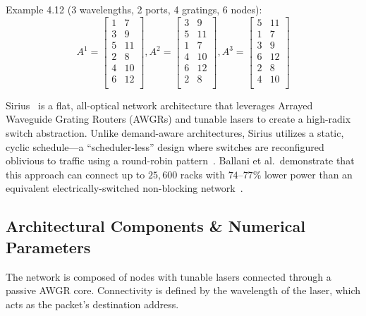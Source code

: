 \documentclass{article}
\begin{document}
    Example 4.12 (3 wavelengths, 2 ports, 4 gratings, 6 nodes): \\
    \[
        A^{1} =
        \begin{bmatrix}
            1 & 7  \\
            3 & 9  \\
            5 & 11 \\
            2 & 8  \\
            4 & 10 \\
            6 & 12 \\
        \end{bmatrix}
        , A^{2} =
        \begin{bmatrix}
            3 & 9  \\
            5 & 11 \\
            1 & 7  \\
            4 & 10 \\
            6 & 12 \\
            2 & 8  \\
        \end{bmatrix}
        , A^{3} =
        \begin{bmatrix}
            5 & 11 \\
            1 & 7  \\
            3 & 9  \\
            6 & 12 \\
            2 & 8  \\
            4 & 10 \\
        \end{bmatrix}
    \]

    Sirius~\cite{sirius} is a flat, all-optical network architecture that leverages Arrayed Waveguide Grating Routers (AWGRs) and tunable lasers to create a high-radix switch abstraction. Unlike demand-aware architectures, Sirius utilizes a static, cyclic schedule---a ``scheduler-less'' design where switches are reconfigured oblivious to traffic using a round-robin pattern~\cite{sirius}. Ballani et al.\ demonstrate that this approach can connect up to $25{,}600$ racks with $74$--$77\%$ lower power than an equivalent electrically-switched non-blocking network~\cite{sirius}.

    \subsection{Architectural Components \& Numerical Parameters}
    The network is composed of nodes with tunable lasers connected through a passive AWGR core. Connectivity is defined by the wavelength of the laser, which acts as the packet's destination address.
\end{document}
